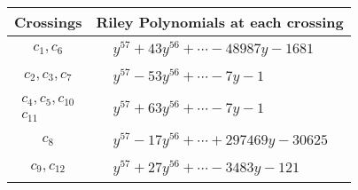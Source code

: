 \documentclass[1p]{elsarticle_modified}
\theoremstyle{definition}
\begin{document}
\begin{tabular}{m{50pt}|m{274pt}}
Crossings & \hspace{64pt}Riley Polynomials at each crossing \\
\hline $$\begin{aligned}c_{1},c_{6}\end{aligned}$$&$\begin{aligned}
&y^{57}+43 y^{56}+\cdots-48987 y-1681
\end{aligned}$\\
\hline $$\begin{aligned}c_{2},c_{3},c_{7}\end{aligned}$$&$\begin{aligned}
&y^{57}-53 y^{56}+\cdots-7 y-1
\end{aligned}$\\
\hline $$\begin{aligned}c_{4},c_{5},c_{10}\\c_{11}\end{aligned}$$&$\begin{aligned}
&y^{57}+63 y^{56}+\cdots-7 y-1
\end{aligned}$\\
\hline $$\begin{aligned}c_{8}\end{aligned}$$&$\begin{aligned}
&y^{57}-17 y^{56}+\cdots+297469 y-30625
\end{aligned}$\\
\hline $$\begin{aligned}c_{9},c_{12}\end{aligned}$$&$\begin{aligned}
&y^{57}+27 y^{56}+\cdots-3483 y-121
\end{aligned}$\\
\hline
\end{tabular}
\vskip 2pc
\end{document}
